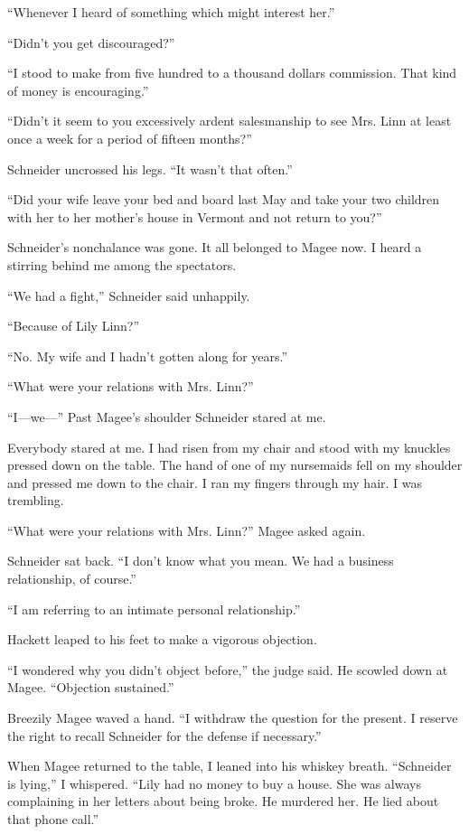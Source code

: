 \documentclass{novel}
\begin{document}
“Whenever I heard of something which might interest her.”

“Didn’t you get discouraged?”

“I stood to make from five hundred to a thousand dollars commission. That kind of money is encouraging.”

“Didn’t it seem to you excessively ardent salesmanship to see Mrs. Linn at least once a week for a period of fifteen months?”

Schneider uncrossed his legs. “It wasn’t that often.”

“Did your wife leave your bed and board last May and take your two children with her to her mother’s house in Vermont and not return to you?”

Schneider’s nonchalance was gone. It all belonged to Magee now. I heard a stirring behind me among the spectators.

“We had a fight,” Schneider said unhappily.

“Because of Lily Linn?”

“No. My wife and I hadn’t gotten along for years.”

“What were your relations with Mrs. Linn?”

“I—we—” Past Magee’s shoulder Schneider stared at me.

Everybody stared at me. I had risen from my chair and stood with my knuckles pressed down on the table. The hand of one of my nursemaids fell on my shoulder and pressed me down to the chair. I ran my fingers through my hair. I was trembling.

“What were your relations with Mrs. Linn?” Magee asked again.

Schneider sat back. “I don’t know what you mean. We had a business relationship, of course.”

“I am referring to an intimate personal relationship.”

Hackett leaped to his feet to make a vigorous objection.

“I wondered why you didn’t object before,” the judge said. He scowled down at Magee. “Objection sustained.”

Breezily Magee waved a hand. “I withdraw the question for the present. I reserve the right to recall Schneider for the defense if necessary.”

When Magee returned to the table, I leaned into his whiskey breath. “Schneider is lying,” I whispered. “Lily had no money to buy a house. She was always complaining in her letters about being broke. He murdered her. He lied about that phone call.”
\end{document}
